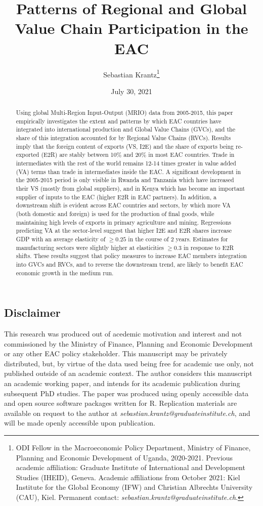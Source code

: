 \documentclass[a4paper]{article}
\date{July 30, 2021}
\title{\textbf{Patterns of Regional and Global Value Chain Participation in the EAC}}
\author{Sebastian Krantz\footnote{ODI Fellow in the Macroeconomic Policy Department, Ministry of Finance, Planning and Economic Development of Uganda, 2020-2021. Previous academic affiliation: Graduate Institute of International and Development Studies (IHEID), Geneva. Academic affiliations from October 2021: Kiel Institute for the Global Economy (IFW) and Christian Albrechts University (CAU), Kiel. Permanent contact: \emph{sebastian.krantz@graduateinstitute.ch}.}}
\begin{document}
\maketitle

\begin{abstract}
Using global Multi-Region Input-Output (MRIO) data from 2005-2015, this paper empirically investigates the extent and patterns by which EAC countries have integrated into international production and Global Value Chains (GVCs), and the share of this integration accounted for by Regional Value Chains (RVCs). Results imply that the foreign content of exports (VS, I2E) and the share of exports being re-exported (E2R) are stably between 10\% and 20\% in most EAC countries. Trade in intermediates with the rest of the world remains 12-14 times greater in value added (VA) terms than trade in intermediates inside the EAC. A significant development in the 2005-2015 period is only visible in Rwanda and Tanzania which have increased their VS (mostly from global suppliers), and in Kenya which has become an important supplier of inputs to the EAC (higher E2R in EAC partners). In addition, a downstream shift is evident across EAC countries and sectors, by which more VA (both domestic and foreign) is used for the production of final goods, while maintaining high levels of exports in primary agriculture and mining. Regressions predicting VA at the sector-level suggest that higher I2E and E2R shares increase GDP with an average elasticity of $\geq 0.25$ in the course of 2 years. Estimates for manufacturing sectors were slightly higher at elasticities $\geq 0.3$ in response to E2R shifts. These results suggest that policy measures to increase EAC members integration into GVCs and RVCs, and to reverse the downstream trend, are likely to benefit EAC economic growth in the medium run.  
\end{abstract}

\vspace{4.8cm}

\subsection*{Disclaimer}
This research was produced out of acedemic motivation and interest and not commissioned by the  Ministry of Finance, Planning and Economic Development or any other EAC policy stakeholder. This manuscript may be privately distributed, but, by virtue of the data used being free for academic use only, not published outside of an academic context. The author considers this manuscript an academic working paper, and intends for its academic publication during subsequent PhD studies. The paper was produced using openly accessible data and open source software packages written for R. Replication materials are available on request to the author at  \emph{sebastian.krantz@graduateinstitute.ch}, and will be made openly accessible upon publication. 
\end{document}
